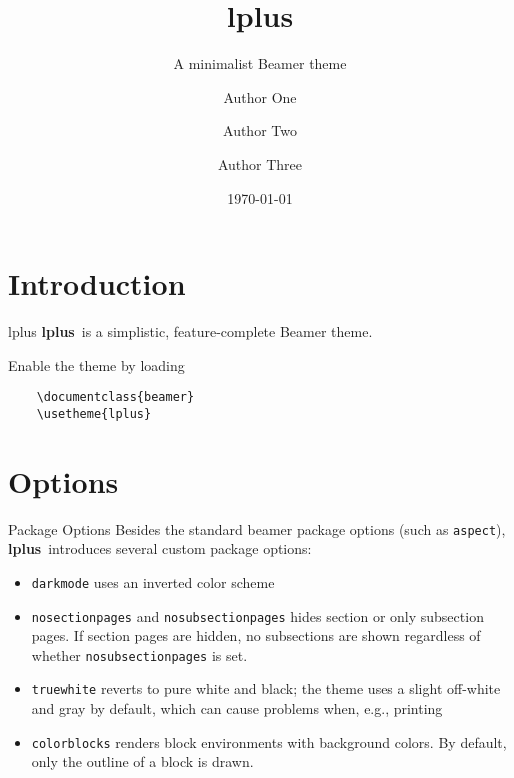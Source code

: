 \documentclass[aspectratio=169,colorblocks,darkmode]{beamer}
\title[L+]{lplus}
\subtitle[Beamer Theme]{A minimalist Beamer theme}
\author[Author One et al.]{Author One \inst{1} \and Author Two \inst{1} \and Author Three \inst{2}}
\institute{\inst{1} First institute \and \inst{2} Second institute}
\date{\today}
\newcommand{\themename}{\textbf{lplus}~}
\begin{document}
\maketitle


\section{Introduction}

\begin{frame}[fragile]{lplus}
\themename  is a simplistic, feature-complete Beamer theme.

Enable the theme by loading
\begin{verbatim}
    \documentclass{beamer}
    \usetheme{lplus}
\end{verbatim}
\end{frame}

\section{Options}

\begin{frame}[fragile]{Package Options}
Besides the standard beamer package options (such as \alert{\texttt{aspect}}), \themename introduces several custom package options:
\begin{itemize}
\item \alert{\texttt{darkmode}} uses an inverted color scheme
\item \alert{\texttt{nosectionpages}} and \alert{\texttt{nosubsectionpages}} hides section or only subsection pages. If section pages are hidden, no subsections are shown regardless of whether \alert{\texttt{nosubsectionpages}} is set.
\item \alert{\texttt{truewhite}} reverts to pure white and black; the theme uses a slight off-white and gray by default, which can cause problems when, e.g., printing
\item \alert{\texttt{colorblocks}} renders block environments with background colors. By default, only the outline of a block is drawn.
\end{itemize}
\end{frame}
\end{document}
